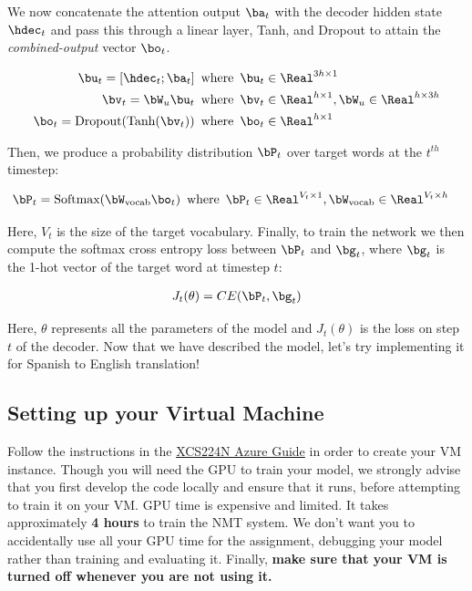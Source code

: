 We now concatenate the attention output $\ba_t$ with the decoder hidden state $\hdec_t$ and pass this through a linear layer, Tanh, and Dropout to attain the \textit{combined-output} vector $\bo_{t}$.

\begin{align}   
    \bu_{t} = [\hdec_t; \ba_{t}] \enspace &\text{where} \enspace \bu_t \in \Real^{3h \times 1} \\
    \bv_t = \bW_{u}\bu_t \enspace &\text{where} \enspace \bv_t \in \Real^{h \times 1}, \bW_{u} \in \Real^{h \times 3h}\\
    \bo_t = \text{Dropout}(\text{Tanh}(\bv_t)) \enspace &\text{where} \enspace \bo_t \in \Real^{h \times 1}
\end{align}

Then, we produce a probability distribution $\bP_t$ over target words at the $t^{th}$ timestep:

\begin{align}
    \bP_t = \text{Softmax}(\bW_{\text{vocab}}\bo_{t}) \enspace &\text{where} \enspace \bP_t \in \Real^{V_{t} \times 1}, \bW_{\text{vocab}} \in \Real^{V_{t} \times h}
\end{align}

Here, $V_{t}$ is the size of the target vocabulary. Finally, to train the network we then compute the softmax cross entropy loss between $\bP_t$ and $\bg_{t}$, where $\bg_{t}$ is the 1-hot vector of the target word at timestep $t$:

\begin{align}
    J_t(\theta) = CE(\bP_t,\bg_{t})
\end{align}

Here, $\theta$ represents all the parameters of the model and $J_t(\theta)$ is the loss on step $t$ of the decoder.
Now that we have described the model, let's try implementing it for Spanish to English translation!

\subsection*{{\color{red} Setting up your Virtual Machine}}
Follow the instructions in the \href{https://docs.google.com/document/d/10J520Vnb1LnAMo0qgSYpG5cEEbomqQ371NIqg1IAv-4/edit?usp=sharing}{XCS224N Azure Guide} in order to create your VM instance. Though you will need the GPU to train your model, we strongly advise that you first develop the code locally and ensure that it runs, before attempting to train it on your VM. GPU time is expensive and limited. It takes approximately \textbf{4 hours} to train the NMT system. We don't want you to accidentally use all your GPU time for the assignment, debugging your model rather than training and evaluating it. Finally, \textbf{make sure that your VM is turned off whenever you are not using it.}

